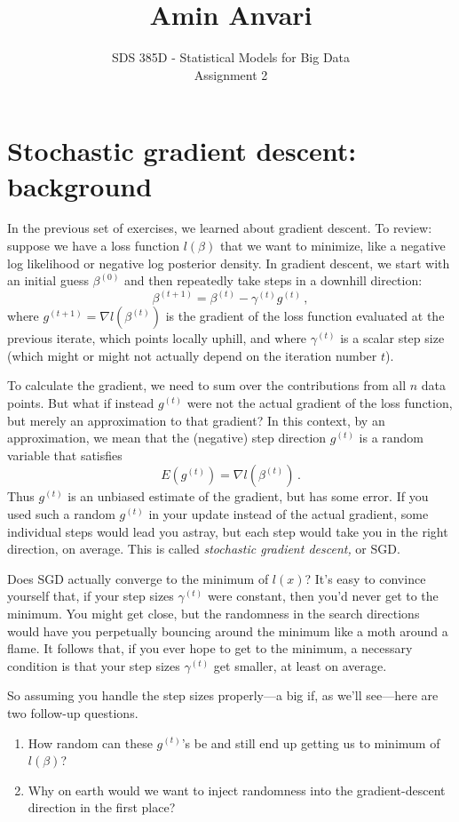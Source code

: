 \documentclass{article}
\title{Amin Anvari}
\date{}
\author{SDS 385D - Statistical Models for Big Data\\ Assignment 2}
\date{}  %
\begin{document}
\maketitle%


\section{Stochastic gradient descent: background}

In the previous set of exercises, we learned about gradient descent.  To review: suppose we have a loss function $l(\beta)$ that we want to minimize, like a negative log likelihood or negative log posterior density.  In gradient descent, we start with an initial guess $\beta^{(0)}$ and then repeatedly take steps in a downhill direction:
$$
\beta^{(t+1)} = \beta^{(t)} - \gamma^{(t)} g^{(t)} \, ,
$$
where $g^{(t+1)}  = \nabla l(\beta^{(t)})$ is the gradient of the loss function evaluated at the previous iterate, which points locally uphill, and where $ \gamma^{(t)}$ is a scalar step size (which might or might not actually depend on the iteration number $t$).

To calculate the gradient, we need to sum over the contributions from all $n$ data points.  But what if instead $g^{(t)}$ were not the actual gradient of the loss function, but merely an approximation to that gradient?  In this context, by an approximation, we mean that the (negative) step direction $g^{(t)}$ is a random variable that satisfies
$$
E(g^{(t)}) = \nabla l(\beta^{(t)}) \, .
$$
Thus $g^{(t)}$ is an unbiased estimate of the gradient, but has some error.   If you used such a random $g^{(t)}$ in your update instead of the actual gradient, some individual steps would lead you astray, but each step would take you in the right direction, on average.  This is called \textit{stochastic gradient descent,} or SGD. 

Does SGD actually converge to the minimum of $l(x)$?  It's easy to convince yourself that, if your step sizes $\gamma^{(t)}$ were constant, then you'd never get to the minimum.  You might get close, but the randomness in the search directions would have you perpetually bouncing around the minimum like a moth around a flame.  It follows that, if you ever hope to get to the minimum, a necessary condition is that your step sizes $\gamma^{(t)}$ get smaller, at least on average.

So assuming you handle the step sizes properly---a big if, as we'll see---here are two follow-up questions.
\begin{enumerate}
\item How random can these $g^{(t)}$'s be and still end up getting us to minimum of $l(\beta)$? 
\item Why on earth would we want to inject randomness into the gradient-descent direction in the first place?
\end{enumerate}
\end{document}
